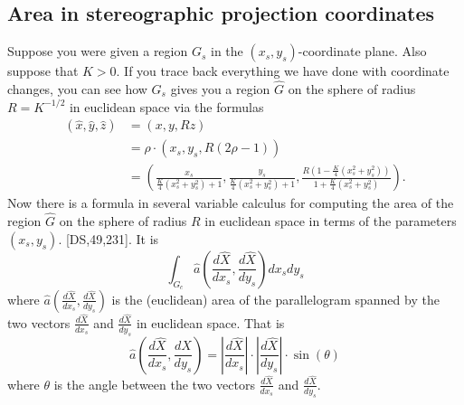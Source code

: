\documentclass{ximera}
\begin{document}
\subsection*{Area in stereographic projection coordinates}

Suppose you were given a region $G_{s}$ in the $\left(  x_{s},y_{s}\right)
$-coordinate plane. Also suppose that $K>0$. If you trace back everything we
have done with coordinate changes, you can see how $G_{s}$ gives you a region
$\hat{G}$ on the sphere of radius $R=K^{-1/2}$ in euclidean space via the
formulas%
\begin{align*}
\left(  \hat{x},\hat{y},\hat{z}\right)   &  =\left(  x,y,Rz\right) \\
&  =\rho\cdot\left(  x_{s},y_{s},R\left(  2\rho-1\right)
\right) \\
&  =\left(  \frac{x_{s}}{\frac{K}{4}\left(  x_{s}^{2}+y_{s}^{2}\right)
+1},\frac{y_{s}}{\frac{K}{4}\left(  x_{s}^{2}+y_{s}^{2}\right)  +1}%
,\frac{R\left(  1-\frac{K}{4}\left(  x_{s}^{2}+y_{s}^{2}\right)  \right)
}{1+\frac{K}{4}\left(  x_{s}^{2}+y_{s}^{2}\right)  }\right)  .
\end{align*}
Now there is a formula in several variable calculus for computing the area of
the region $\hat{G}$ on the sphere of radius $R$ in euclidean space in
terms of the parameters $\left(  x_{s},y_{s}\right)  $. [DS,49,231]. It is
\[%
{\displaystyle\int\nolimits_{G_{c}}}
\hat{a}\left(  \frac{d\hat{X}}{dx_{s}},\frac{d\hat{X}}{dy_{s}}\right)
dx_{s}dy_{s}%
\]
where $\hat{a}\left(  \frac{d\hat{X}}{dx_{s}},\frac{d\hat{X}}{dy_{s}}\right)
$ is the (euclidean) area of the parallelogram spanned by the two vectors
$\frac{d\hat{X}}{dx_{s}}$ and $\frac{d\hat{X}}{dy_{s}}$ in euclidean
space. That is%
\[
\hat{a}\left(  \frac{d\hat{X}}{dx_{s}},\frac{d\hat{X}}{dy_{s}}\right)
=\left\vert \frac{d\hat{X}}{dx_{s}}\right\vert \cdot \left\vert \frac{d\hat{X}}{dy_{s}}\right\vert \cdot\sin(\theta)
\]
where $\theta$ is the angle between the two vectors $\frac{d\hat{X}}{dx_{s}}$
and $\frac{d\hat{X}}{dy_{s}}$.
\end{document}
